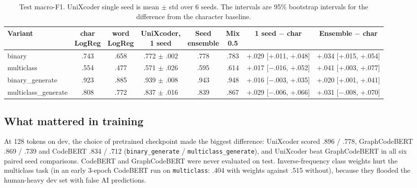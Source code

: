 \documentclass[11pt]{article}
\begin{document}
\begin{table}[t]
  \centering
  \small
  \setlength{\tabcolsep}{4pt}
  \begin{tabular}{lccccccc}
    \hline
    \textbf{Variant} & \makecell{\textbf{char}\\\textbf{LogReg}} & \makecell{\textbf{word}\\\textbf{LogReg}} & \makecell{\textbf{UniXcoder,}\\\textbf{1 seed}} & \makecell{\textbf{Seed}\\\textbf{ensemble}} & \makecell{\textbf{Mix}\\\textbf{0.5}} & \makecell{\textbf{1 seed}\\\textbf{$-$ char}} & \makecell{\textbf{Ensemble}\\\textbf{$-$ char}} \\
    \hline
    binary              & .743 & .658 & .772 $\pm$ .002 & .778 & .783 & +.029 [+.011, +.048]   & +.034 [+.015, +.054] \\
    multiclass          & .554 & .477 & .571 $\pm$ .026 & .595 & .614 & +.017 [$-$.016, +.052] & +.041 [+.003, +.077] \\
    binary\_generate     & .923 & .885 & .939 $\pm$ .008 & .943 & .948 & +.016 [$-$.003, +.035] & +.020 [+.001, +.041] \\
    multiclass\_generate & .808 & .772 & .837 $\pm$ .016 & .839 & .867 & +.029 [$-$.006, +.066] & +.031 [$-$.008, +.070] \\
    \hline
  \end{tabular}
  \caption{Test macro-F1. UniXcoder single seed is mean $\pm$ std over 6 seeds. The intervals are 95\% bootstrap intervals for the difference from the character baseline.}
  \label{tab:test}
\end{table}

\subsection{What mattered in training}
\label{sec:training}

At 128 tokens on dev, the choice of pretrained checkpoint made the biggest difference: UniXcoder scored .896 / .778, GraphCodeBERT .869 / .739 and CodeBERT .834 / .712 (\texttt{binary\_generate} / \texttt{multiclass\_generate}), and UniXcoder beat GraphCodeBERT in all six paired seed comparisons. CodeBERT and GraphCodeBERT were never evaluated on test. Inverse-frequency class weights hurt the multiclass task (in an early 3-epoch CodeBERT run on \texttt{multiclass}: .404 with weights against .515 without), because they flooded the human-heavy dev set with false AI predictions.
\end{document}
